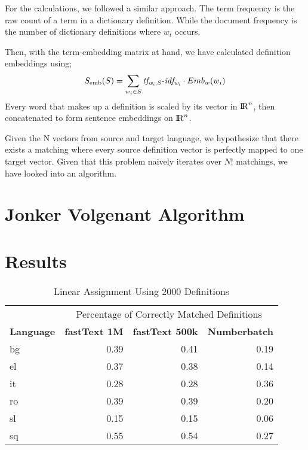 For the \tfidf{} calculations, we followed a similar approach.
The term frequency is the raw count of a term in a dictionary definition.
While the document frequency is the number of dictionary definitions where $w_t$ occurs.

Then, with the term-embedding matrix at hand, we have calculated definition embeddings using;
\begin{equation}
    S_{\text{emb}}(S) = \sum_{w_{i} \in S} {\operatorname{\mathit{tf_{w_{i},S}-idf_{w_i}}}} \cdot Emb_{w}(w_{i})
\end{equation}
Every word that makes up a definition is scaled by its vector in ${\rm I\!R}^n$, then concatenated to form sentence embeddings on ${\rm I\!R}^n$.

Given the N vectors from source and target language, we hypothesize that there exists a matching where every source definition vector is perfectly mapped to one target vector.
Given that this problem naively iterates over $N!$ matchings, we have looked into an algorithm.

%
\section{Jonker Volgenant Algorithm}%
\label{sec:jonker_volgenant_algorithm}

\section{Results}%
\label{sec:results}

\begin{table}[htbp]
    \centering
    \begin{tabular}{lrrr}
        \toprule
& \multicolumn{3}{c}{Percentage of Correctly Matched Definitions} \\
\cmidrule(lr){2-4}
        \textbf{Language} & \textbf{fastText 1M} & \textbf{fastText 500k} & \textbf{Numberbatch} \\
        \midrule
        bg & 0.39 & 0.41 & 0.19 \\
        el & 0.37 & 0.38 & 0.14 \\
        it & 0.28 & 0.28 & 0.36 \\
        ro & 0.39 & 0.39 & 0.20 \\
        sl & 0.15 & 0.15 & 0.06 \\
        sq & 0.55 & 0.54 & 0.27 \\
        \bottomrule
    \end{tabular}
    \caption{Linear Assignment Using 2000 Definitions}%
    \label{tab:lapjv_2000}
\end{table}


